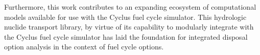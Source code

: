 \documentclass{anstrans}
\begin{document}
Furthermore, this work contributes to an expanding ecosystem of computational 
models available for use with the Cyclus fuel cycle simulator. This hydrologic 
nuclide transport library, by virtue of its capability to modularly integrate 
with the Cyclus fuel cycle simulator has laid the foundation for integrated 
disposal option analysis in the context of fuel cycle options. 



\end{document}
